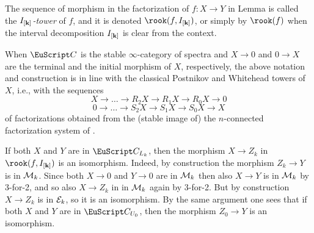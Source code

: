 \begin{definition}
The sequence of morphism in the factorization of $f\colon X\to Y$ in Lemma  is called the \emph{$I_{[\mathbf{k}]}$-tower} of $f$, and it is denoted $\rook(f,I_{\ordk})$, or simply by $\rook(f)$ when the interval decomposition $I_{[\mathbf{k}]}$ is clear from the context.
\end{definition}
\begin{remark}
When $\C$ is the stable $\infty$-category of spectra and $X\to 0$ and $0\to X$ are the terminal and the initial morphism of $X$, respectively, the above notation and construction is in line with the classical Postnikov and Whitehead towers of $X$, i.e., with the sequences
\[
X\to \dots \to R_2X\to R_1X\to R_0X \to 0
\]
\[
0\to \dots \to S_2X\to S_1X\to S_0X \to X
\]
of factorizations obtained from the (stable image of) the $n$-connected factorization system of \cite{Joy}. 
\end{remark}
\begin{remark}\label{rem.trivial-factorizations}
If both $X$ and $Y$ are in $\C_{L_k}$, then the morphism $X\to Z_{k}$ in $\rook(f,I_{\ordk})$ is an isomorphism. Indeed, by construction the morphism $Z_{k}\to Y$ is in $\mathcal{M}_{k}$. Since both $X\to 0$ and $Y\to 0$ are in $\mathcal{M}_{k}$ then also $X\to Y$ is in $\mathcal{M}_{k}$ by 3-for-2, and so also $X\to Z_{k}$ in in $\mathcal{M}_{k}$ again by 3-for-2. But by construction $X\to Z_{k}$ is in $\mathcal{E}_{k}$, so it is an isomorphism. By the same argument one sees that if both $X$ and $Y$ are in $\C_{U_0}$, then the morphism $Z_{0}\to Y$ is an isomorphism.
\end{remark}

